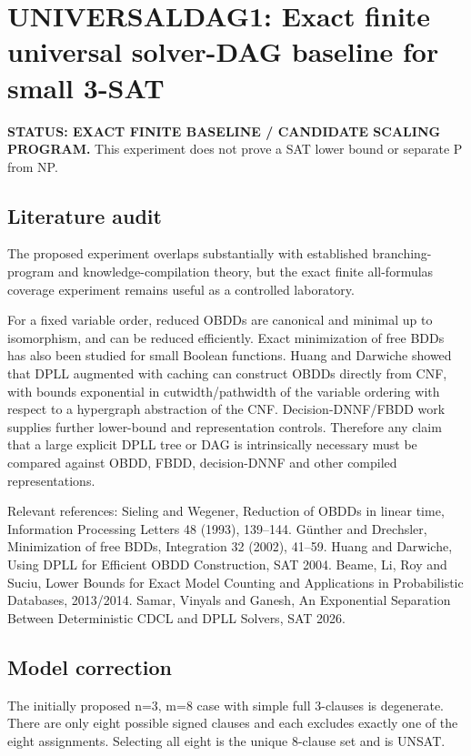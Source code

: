 \section*{UNIVERSALDAG1: Exact finite universal solver-DAG baseline for small 3-SAT}

\textbf{STATUS: EXACT FINITE BASELINE / CANDIDATE SCALING PROGRAM.}
This experiment does not prove a SAT lower bound or separate P from NP.

\subsection*{Literature audit}
The proposed experiment overlaps substantially with established branching-program and knowledge-compilation theory, but the exact finite all-formulas coverage experiment remains useful as a controlled laboratory.

For a fixed variable order, reduced OBDDs are canonical and minimal up to isomorphism, and can be reduced efficiently. Exact minimization of free BDDs has also been studied for small Boolean functions. Huang and Darwiche showed that DPLL augmented with caching can construct OBDDs directly from CNF, with bounds exponential in cutwidth/pathwidth of the variable ordering with respect to a hypergraph abstraction of the CNF. Decision-DNNF/FBDD work supplies further lower-bound and representation controls. Therefore any claim that a large explicit DPLL tree or DAG is intrinsically necessary must be compared against OBDD, FBDD, decision-DNNF and other compiled representations.

Relevant references:
Sieling and Wegener, Reduction of OBDDs in linear time, Information Processing Letters 48 (1993), 139--144.
Günther and Drechsler, Minimization of free BDDs, Integration 32 (2002), 41--59.
Huang and Darwiche, Using DPLL for Efficient OBDD Construction, SAT 2004.
Beame, Li, Roy and Suciu, Lower Bounds for Exact Model Counting and Applications in Probabilistic Databases, 2013/2014.
Samar, Vinyals and Ganesh, An Exponential Separation Between Deterministic CDCL and DPLL Solvers, SAT 2026.

\subsection*{Model correction}
The initially proposed n=3, m=8 case with simple full 3-clauses is degenerate. There are only eight possible signed clauses and each excludes exactly one of the eight assignments. Selecting all eight is the unique 8-clause set and is UNSAT.

